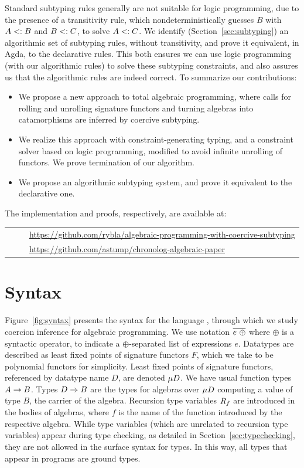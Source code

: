 \documentclass[pdflatex,sn-mathphys-num]{sn-jnl}%
\theoremstyle{thmstyleone}%
\theoremstyle{thmstyletwo}%
\theoremstyle{thmstylethree}%
\begin{document}
Standard subtyping rules generally are not suitable for logic
programming, due to the presence of a transitivity rule, which
nondeterministically guesses $B$ with $A \mathrel{<:} B$ and $B \mathrel{<:}
C$, to solve $A \mathrel{<:} C$.  We identify
(Section~\ref{sec:subtyping}) an algorithmic set of subtyping rules,
without transitivity, and prove it equivalent, in Agda, to the
declarative rules.  This both ensures we can use logic programming
(with our algorithmic rules) to solve these subtyping constraints, and
also assures us that the algorithmic rules are indeed correct.  To
summarize our contributions:
\begin{itemize}
  \item We propose a new approach to total algebraic programming,
    where calls for rolling and unrolling signature functors
    and turning algebras into catamorphisms are inferred by coercive
    subtyping.
  \item We realize this approach with constraint-generating typing,
    and a constraint solver based on logic programming, modified
    to avoid infinite unrolling of functors. We prove termination of
    our algorithm.
  \item We propose an algorithmic subtyping system, and prove it
    equivalent to the declarative one.
\end{itemize}

The implementation and proofs, respectively, are available at:
\begin{tabular}{ll}
\ \ \ &  \url{https://github.com/rybla/algebraic-programming-with-coercive-subtyping} \\
\ \ \ &  \url{https://github.com/astump/chronolog-algebraic-paper}
\end{tabular}
\section{Syntax}

Figure~\ref{fig:syntax} presents the syntax for the language \lcata,
through which we study coercion inference for algebraic
programming. We use notation $\overline{e ~\oplus}$ where $\oplus$ is a
syntactic operator, to indicate a $\oplus$-separated list of
expressions $e$. Datatypes are described as least fixed points of
signature functors $F$, which we take to be polynomial functors for
simplicity. Least fixed points of signature functors, referenced by
datatype name $D$, are denoted $\mu D$.  We have usual function
types $A \to B$.  Types $D \Rightarrow B$ are the types for algebras over
$\mu D$ computing a value of type $B$, the carrier of the algebra.
Recursion type variables $\textit{R}_{f}$ are introduced in the bodies of
algebras, where $f$ is the name of the function introduced by the
respective algebra.  While type variables (which are unrelated to
recursion type variables) appear during type checking, as detailed in
Section~\ref{sec:typechecking}, they are not allowed in the surface
syntax for types.  In this way, all types that appear in programs are
ground types.
\end{document}

